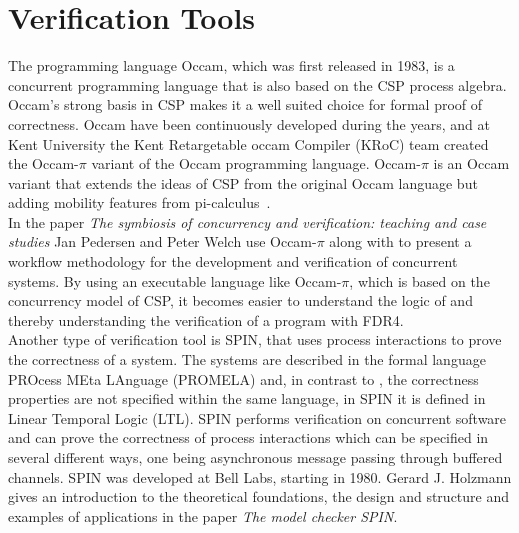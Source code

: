 \section{Verification Tools}
The programming language Occam\cite{Occam1995}, which was first released in 1983, is a concurrent programming language that is also based on the CSP process algebra. Occam's strong basis in CSP makes it a well suited choice for formal proof of correctness.
Occam have been continuously developed during the years, and at Kent University the Kent Retargetable occam Compiler (KRoC) team created the Occam-$\pi$\cite{UniveristyofKent} variant of the Occam programming language.
Occam-$\pi$ is an Occam variant that extends the ideas of CSP from the original Occam language but adding mobility features from pi-calculus~\cite{Milner1992}.
\\
In the paper \textit{The symbiosis of concurrency and verification: teaching and case studies}\cite{Pedersen2018} Jan Pedersen and Peter Welch use Occam-$\pi$ along with \cspm{} to present a workflow methodology for the development and verification of concurrent systems. By using an executable language like Occam-$\pi$, which is based on the concurrency model of CSP, it becomes easier to understand the logic of \cspm{} and thereby understanding the verification of a program with FDR4.\\

Another type of verification tool is SPIN\cite{spin}, that uses process interactions to prove the correctness of a system. The systems are described in the formal language PROcess MEta LAnguage (PROMELA)\cite{Holzmann1991} and, in contrast to \cspm, the correctness properties are not specified within the same language, in SPIN it is defined in Linear Temporal Logic (LTL)\cite{Pnueli1977}.
SPIN performs verification on concurrent software and can prove the correctness of process interactions which can be specified in several different ways, one being asynchronous message passing through buffered channels.
SPIN was developed at Bell Labs, starting in 1980. Gerard J. Holzmann gives an introduction to the theoretical foundations, the design and structure and examples of applications in the paper \textit{The model checker SPIN}\cite{Holzmann1997}.\\

